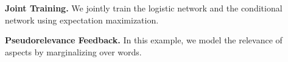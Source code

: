 \documentclass[sigconf,authordraft]{acmart}
\begin{document}
\textbf{Joint Training.} We jointly train the logistic network and the conditional network using expectation maximization.


\textbf{Pseudorelevance Feedback.} In this example, we model the relevance of aspects by marginalizing over words.





\end{document}
